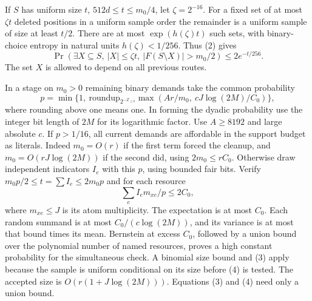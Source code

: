\documentclass[11pt]{article}
\begin{document}
If \(S\) has uniform size \(t\), \(512d\le t\le m_0/4\), let \(\zeta=2^{-16}\). For a fixed set of at most \(\zeta t\) deleted positions in a uniform sample order the remainder is a uniform sample of size at least \(t/2\). There are at most \(\exp(h(\zeta)t)\) such sets, with binary-choice entropy in natural units \(h(\zeta)<1/256\). Thus (2) gives
\[
 \Pr(\exists X\subseteq S,\ |X|\le\zeta t,\ |F(S\setminus X)|>m_0/2)\le 2e^{-t/256}.
\tag{3}
\]
The set \(X\) is allowed to depend on all previous routes.

In a stage on \(m_0>0\) remaining binary demands take the common probability
\[
 p=\min\{1,\ \mathrm{roundup}_{2^{-\mathbb Z_{\ge0}}}\max(A r/m_0,\ cJ\log(2M)/C_0)\},
\]
where rounding above one means one. In forming the dyadic probability use the integer bit length of \(2M\) for its logarithmic factor. Use \(A\ge8192\) and large absolute \(c\). If \(p>1/16\), all current demands are affordable in the support budget as literals. Indeed \(m_0=O(r)\) if the first term forced the cleanup, and \(m_0=O(rJ\log(2M))\) if the second did, using \(2m_0\le r C_0\). Otherwise draw independent indicators \(I_e\) with this \(p\), using bounded fair bits. Verify \(m_0p/2\le t=\sum I_e\le2m_0p\) and for each resource
\[
 \sum_e I_e m_{xe}/p\le2C_0,
\tag{4}
\]
where \(m_{xe}\le J\) is its atom multiplicity. The expectation is at most \(C_0\). Each random summand is at most \(C_0/(c\log(2M))\), and its variance is at most that bound times its mean. Bernstein at excess \(C_0\), followed by a union bound over the polynomial number of named resources, proves a high constant probability for the simultaneous check. A binomial size bound and (3) apply because the sample is uniform conditional on its size before (4) is tested. The accepted size is \(O(r(1+J\log(2M)))\). Equations (3) and (4) need only a union bound.
\end{document}
